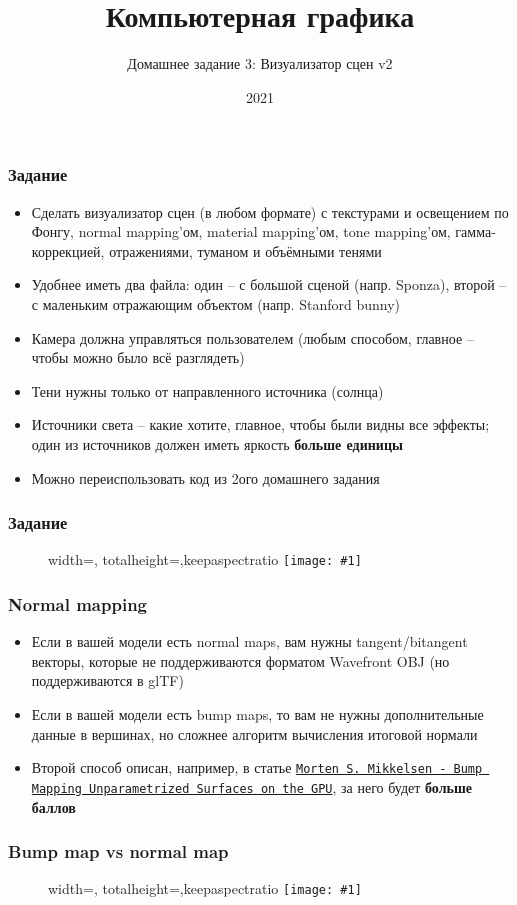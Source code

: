 \documentclass[10pt]{beamer}
\title{Компьютерная графика}
\subtitle{Домашнее задание 3: Визуализатор сцен v2}
\date{2021}
\newcommand{\slideimage}[1]{
  \begin{figure}
    \begin{adjustbox}{width=\textwidth, totalheight=\textheight-2\baselineskip-2\baselineskip,keepaspectratio}
      \texttt{[image: \#1]}
    \end{adjustbox}
  \end{figure}
}
\begin{document}
\frame{\titlepage}

\begin{frame}[fragile]
\frametitle{Задание}
\begin{itemize}
\item Сделать визуализатор сцен (в любом формате) с текстурами и освещением по Фонгу, normal mapping'ом, material mapping'ом, tone mapping'ом, гамма-коррекцией, отражениями, туманом и объёмными тенями
\pause
\item Удобнее иметь два файла: один -- с большой сценой (напр. Sponza), второй -- с маленьким отражающим объектом (напр. Stanford bunny)
\pause
\item Камера должна управляться пользователем (любым способом, главное -- чтобы можно было всё разглядеть)
\pause
\item Тени нужны только от направленного источника (солнца)
\pause
\item Источники света -- какие хотите, главное, чтобы были видны все эффекты; один из источников должен иметь яркость \textbf{больше единицы}
\pause
\item Можно переиспользовать код из 2ого домашнего задания
\end{itemize}
\end{frame}

\begin{frame}[fragile]
\frametitle{Задание}
\slideimage{example.png}
\end{frame}

\begin{frame}[fragile]
\frametitle{Normal mapping}
\begin{itemize}
\item Если в вашей модели есть normal maps, вам нужны tangent/bitangent векторы, которые не поддерживаются форматом Wavefront OBJ (но поддерживаются в glTF)
\pause
\item Если в вашей модели есть bump maps, то вам не нужны дополнительные данные в вершинах, но сложнее алгоритм вычисления итоговой нормали
\pause
\item Второй способ описан, например, в статье \href{https://mmikk.github.io/papers3d/mm_sfgrad_bump.pdf}{\texttt{Morten S. Mikkelsen - Bump Mapping Unparametrized Surfaces on the GPU}}, за него будет \textbf{больше баллов}
\end{itemize}
\end{frame}

\begin{frame}[fragile]
\frametitle{Bump map vs normal map}
\slideimage{bump_vs_normal.png}
\end{frame}
\end{document}
